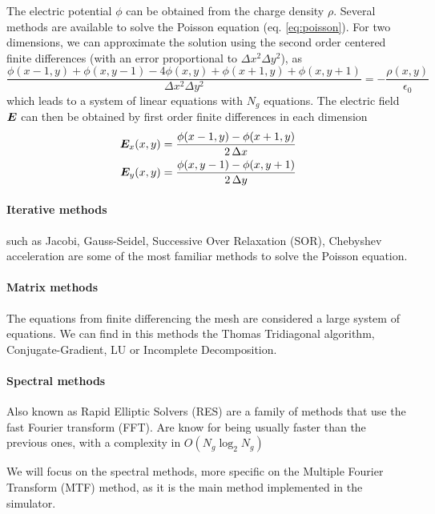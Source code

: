 The electric potential $\phi$ can be obtained from the charge density $\rho$.  
Several methods are available to solve the Poisson equation (eq.  
\ref{eq:poisson}).
%
For two dimensions, we can approximate the solution using the second order 
centered finite differences (with an error proportional to $\Delta x ^2 \Delta 
y^2$), as
%
\begin{equation}
\label{eq:discrete-poisson}
\frac{\phi(x-1, y) + \phi(x, y-1) - 4\phi(x,y) + \phi(x+1,y)+\phi(x,y+1)}{\Delta 
x ^2 \Delta y^2} = - \frac{\rho(x,y)}{\epsilon_0}
\end{equation}
%
which leads to a system of linear equations with $N_g$ equations.
The electric field $\bm{E}$ can then be obtained by first order finite differences 
in each dimension
%
\begin{equation}
\begin{split}
\label{eq:phi-to-E}
\bm{E}_x(x,y) &= \frac{\phi(x-1,y) - \phi(x+1,y)}{2\,\Delta x} \\
\bm{E}_y(x,y) &= \frac{\phi(x,y-1) - \phi(x,y+1)}{2\,\Delta y}
\end{split}
\end{equation}
%

\paragraph{Iterative  methods} such as Jacobi, Gauss-Seidel, Successive Over 
Relaxation (SOR), Chebyshev acceleration are some of the most familiar methods 
to solve the Poisson equation.

\paragraph{Matrix methods} The equations from finite differencing the mesh are 
considered a large system of equations. We can find in this methods the Thomas 
Tridiagonal algorithm, Conjugate-Gradient, LU or Incomplete Decomposition.

\paragraph{Spectral methods} Also known as Rapid Elliptic Solvers (RES) are a 
family of methods that use the fast Fourier transform (FFT). Are know for being 
usually faster than the previous ones, with a complexity in $O(N_g \log_2 N_g)$

We will focus on the spectral methods, more specific on the Multiple Fourier 
Transform (MTF) method, as it is the main method implemented in the simulator.

